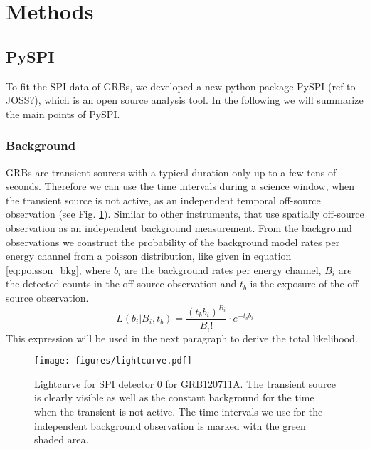 \documentclass[twocolumn]{aa}
\begin{document}
\section{Methods}
\subsection{PySPI}
\label{pyspi}
To fit the SPI data of GRBs, we developed a new python package PySPI (ref to JOSS?), which is an open source analysis tool. In the following we will summarize the main points of PySPI.

\subsubsection*{Background}

GRBs are transient sources with a typical duration only up to a few tens of seconds. Therefore we can use the time intervals during a science window, when the transient source is not active, as an independent temporal off-source observation (see Fig. \ref{fig:lightcurve}). Similar to other instruments, that use spatially off-source observation as an independent background measurement. From the background observations we construct the probability of the background model rates per energy channel from a poisson distribution, like given in equation \ref{eq:poisson_bkg}, where $b_{i}$ are the background rates per energy channel, $B_{i}$ are the detected counts in the off-source observation and $t_{b}$ is the exposure of the off-source observation.
\begin{equation}
	L(b_{i}|B_{i}, t_{b})=\frac{(t_{b} b_{i})^{B_{i}}}{B_{i}!}\cdot e^{-t_{b} b_{i}}
  \label{eq:poisson_bkg}
\end{equation}
This expression will be used in the next paragraph to derive the total likelihood.

\begin{figure}
    \begin{centering}
        \texttt{[image: figures/lightcurve.pdf]}
        \caption{Lightcurve for SPI detector 0 for GRB120711A. The transient source is clearly visible as well as the constant background for the time when the transient is not active. The time intervals we use for the independent background observation is marked with the green shaded area.}
        \label{fig:lightcurve}
    \end{centering}
\end{figure}


\end{document}
